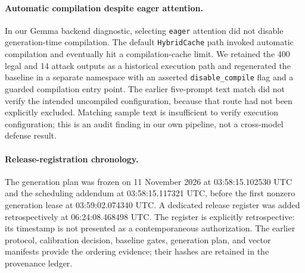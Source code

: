 \paragraph{Automatic compilation despite eager attention.}
In our Gemma backend diagnostic, selecting \texttt{eager} attention did not disable generation-time compilation. The default \texttt{HybridCache} path invoked automatic compilation and eventually hit a compilation-cache limit. We retained the 400 legal and 14 attack outputs as a historical execution path and regenerated the baseline in a separate namespace with an asserted \texttt{disable\_compile} flag and a guarded compilation entry point. The earlier five-prompt text match did not verify the intended uncompiled configuration, because that route had not been explicitly excluded. Matching sample text is insufficient to verify execution configuration; this is an audit finding in our own pipeline, not a cross-model defense result.


\paragraph{Release-registration chronology.}
The generation plan was frozen on 11 November 2026 at
03:58:15.102530 UTC and the scheduling addendum at
03:58:15.117321 UTC, before the first nonzero generation lease at
03:59:02.074340 UTC. A dedicated release register was added retrospectively
at 06:24:08.468498 UTC. The register is explicitly retrospective: its timestamp
is not presented as a contemporaneous authorization. The earlier protocol,
calibration decision, baseline gates, generation plan, and vector manifests
provide the ordering evidence; their hashes are retained in the provenance ledger.
